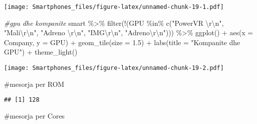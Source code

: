 \documentclass[
]{article}
\newenvironment{Shaded}{\begin{snugshade}}{\end{snugshade}}
\newcommand{\AttributeTok}[1]{\textcolor[rgb]{0.77,0.63,0.00}{#1}}
\newcommand{\CommentTok}[1]{\textcolor[rgb]{0.56,0.35,0.01}{\textit{#1}}}
\newcommand{\FloatTok}[1]{\textcolor[rgb]{0.00,0.00,0.81}{#1}}
\newcommand{\FunctionTok}[1]{\textcolor[rgb]{0.00,0.00,0.00}{#1}}
\newcommand{\NormalTok}[1]{#1}
\newcommand{\SpecialCharTok}[1]{\textcolor[rgb]{0.00,0.00,0.00}{#1}}
\newcommand{\StringTok}[1]{\textcolor[rgb]{0.31,0.60,0.02}{#1}}
\begin{document}
\texttt{[image: Smartphones\_files/figure-latex/unnamed-chunk-19-1.pdf]}

\begin{Shaded}
\begin{Highlighting}[]
\CommentTok{\#gpu dhe kompanite}
\NormalTok{smart }\SpecialCharTok{\%\textgreater{}\%}
 \FunctionTok{filter}\NormalTok{(}\SpecialCharTok{!}\NormalTok{(GPU }\SpecialCharTok{\%in\%} \FunctionTok{c}\NormalTok{(}\StringTok{"PowerVR }\SpecialCharTok{\textbackslash{}r\textbackslash{}n}\StringTok{"}\NormalTok{, }\StringTok{"Mali}\SpecialCharTok{\textbackslash{}r\textbackslash{}n}\StringTok{"}\NormalTok{, }\StringTok{"Adreno }\SpecialCharTok{\textbackslash{}r\textbackslash{}n}\StringTok{"}\NormalTok{, }\StringTok{"IMG}\SpecialCharTok{\textbackslash{}r\textbackslash{}n}\StringTok{"}\NormalTok{, }\StringTok{"Adreno}\SpecialCharTok{\textbackslash{}r\textbackslash{}n}\StringTok{"}\NormalTok{))) }\SpecialCharTok{\%\textgreater{}\%}
 \FunctionTok{ggplot}\NormalTok{() }\SpecialCharTok{+}
  \FunctionTok{aes}\NormalTok{(}\AttributeTok{x =}\NormalTok{ Company, }\AttributeTok{y =}\NormalTok{ GPU) }\SpecialCharTok{+}
  \FunctionTok{geom\_tile}\NormalTok{(}\AttributeTok{size =} \FloatTok{1.5}\NormalTok{) }\SpecialCharTok{+}
  \FunctionTok{labs}\NormalTok{(}\AttributeTok{title =} \StringTok{"Kompanite dhe GPU"}\NormalTok{) }\SpecialCharTok{+}
  \FunctionTok{theme\_light}\NormalTok{()}
\end{Highlighting}
\end{Shaded}

\texttt{[image: Smartphones\_files/figure-latex/unnamed-chunk-19-2.pdf]}

\#mesorja per ROM

\begin{Shaded}
\end{Shaded}

\begin{verbatim}
## [1] 128
\end{verbatim}

\#mesorja per Cores

\begin{Shaded}
\end{Shaded}
\end{document}
